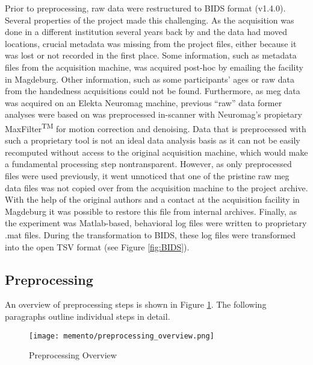 Prior to preprocessing, raw data were restructured to \gls{BIDS} format (v1.4.0).
Several properties of the project made this challenging.
As the acquisition was done in a different institution several years back by \citet{kaiser} and the data had moved locations, crucial metadata was missing from the project files, either because it was lost or not recorded in the first place.
Some information, such as metadata files from the acquisition machine, was acquired post-hoc by emailing the facility in Magdeburg.
Other information, such as some participants' ages or raw data from the handedness acquisitions could not be found.
Furthermore, as \gls{meg} data was acquired on an Elekta Neuromag machine, previous ``raw'' data former analyses were based on was preprocessed in-scanner with Neuromag's propietary MaxFilter\textsuperscript{TM} for motion correction and denoising.
Data that is preprocessed with such a proprietary tool is not an ideal data analysis basis as it can not be easily recomputed without access to the original acquisition machine, which would make a fundamental processing step nontransparent.
However, as only preprocessed files were used previously, it went unnoticed that one of the pristine raw \gls{meg} data files was not copied over from the acquisition machine to the project archive.
With the help of the original authors and a contact at the acquisition facility in Magdeburg it was possible to restore this file from internal archives.
Finally, as the experiment was Matlab-based, behavioral log files were written to proprietary .mat files.
During the transformation to \gls{BIDS}, these log files were transformed into the open TSV format (see Figure \ref{fig:BIDS}).

\subsection{Preprocessing}
\label{preprocessing}

An overview of preprocessing steps is shown in Figure \ref{fig:preproc}.
The following paragraphs outline individual steps in detail.

\begin{figure}
	\centering
	\texttt{[image: memento/preprocessing\_overview.png]}
	\caption[Preprocessing overview]{Preprocessing Overview}
	\label{fig:preproc}
\end{figure}

